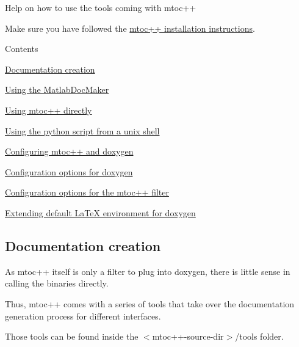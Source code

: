 Help on how to use the tools coming with mtoc++

Make sure you have followed the \hyperlink{install}{mtoc++ installation instructions}.

\begin{DoxyParagraph}{Contents}

\begin{DoxyItemize}
\item \hyperlink{tools_tools_doc}{Documentation creation}
\begin{DoxyItemize}
\item \hyperlink{tools_tools_docmaker}{Using the Matlab\+Doc\+Maker}
\item \hyperlink{tools_tools_direct}{Using mtoc++ directly}
\item \hyperlink{tools_tools_python}{Using the python script from a unix shell}
\end{DoxyItemize}
\item \hyperlink{tools_tools_config}{Configuring mtoc++ and doxygen}
\begin{DoxyItemize}
\item \hyperlink{tools_config_doxy}{Configuration options for doxygen}
\item \hyperlink{tools_config_mtocpp}{Configuration options for the mtoc++ filter}
\item \hyperlink{tools_config_latex}{Extending default La\+Te\+X environment for doxygen}
\end{DoxyItemize}
\end{DoxyItemize}
\end{DoxyParagraph}
\hypertarget{tools_tools_doc}{}\subsection{Documentation creation}\label{tools_tools_doc}
As {\ttfamily mtoc++} itself is only a filter to plug into doxygen, there is little sense in calling the binaries directly.

Thus, mtoc++ comes with a series of tools that take over the documentation generation process for different interfaces.

Those tools can be found inside the {\ttfamily $<$mtoc++-\/source-\/dir$>$/tools} folder.

